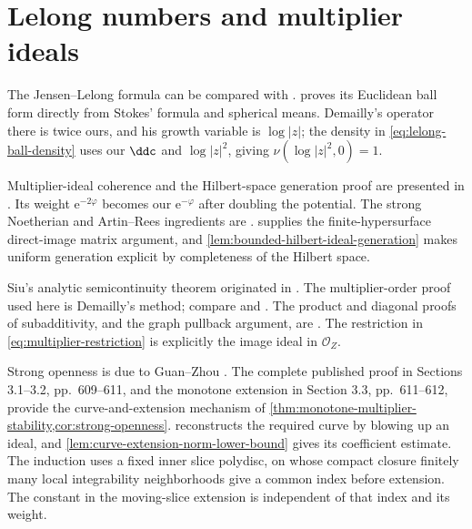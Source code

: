 \section{Lelong numbers and multiplier ideals}
\label{sec:history-lelong-multiplier}
The Jensen--Lelong formula can be compared with \cite[Chapter III, (6.1)--(6.11), pp.~162--166]{DemBook}.  proves its Euclidean ball form directly from Stokes' formula and spherical means. Demailly's operator there is twice ours, and his growth variable is $\log|z|$; the density in \eqref{eq:lelong-ball-density} uses our $\ddc$ and $\log|z|^2$, giving $\nu(\log|z|^2,0)=1$.

Multiplier-ideal coherence and the Hilbert-space generation proof are presented in \cite[Proposition 5.7, pp.~36--37]{DemAnalyticOnline}. Its weight $\mathrm e^{-2\varphi}$ becomes our $\mathrm e^{-\varphi}$ after doubling the potential. The strong Noetherian and Artin--Rees ingredients are \cite[Chapter II, (3.22), p.~90, and Chapter IX, (1.1)--(1.3), pp.~403--404]{DemBook}.  supplies the finite-hypersurface direct-image matrix argument, and \cref{lem:bounded-hilbert-ideal-generation} makes uniform generation explicit by completeness of the Hilbert space.

Siu's analytic semicontinuity theorem originated in \cite{Siu74}. The multiplier-order proof used here is Demailly's method; compare \cite[Corollary 14.3, p.~138]{DemAnalyticOnline} and \cite[Theorem 10.2 and Lemma 10.3, p.~42]{Bou23Notes}. The product and diagonal proofs of subadditivity, and the graph pullback argument, are \cite[(15.1)--(15.3), pp.~158--159]{DemAnalyticOnline}. The restriction in \eqref{eq:multiplier-restriction} is explicitly the image ideal in $\mathcal O_Z$.

Strong openness is due to Guan--Zhou \cite{GZ15Strong}. The complete published proof in Sections 3.1--3.2, pp.~609--611, and the monotone extension in Section 3.3, pp.~611--612, provide the curve-and-extension mechanism of \cref{thm:monotone-multiplier-stability,cor:strong-openness}.  reconstructs the required curve by blowing up an ideal, and \cref{lem:curve-extension-norm-lower-bound} gives its coefficient estimate. The induction uses a fixed inner slice polydisc, on whose compact closure finitely many local integrability neighborhoods give a common index before extension. The constant in the moving-slice extension is independent of that index and its weight.

